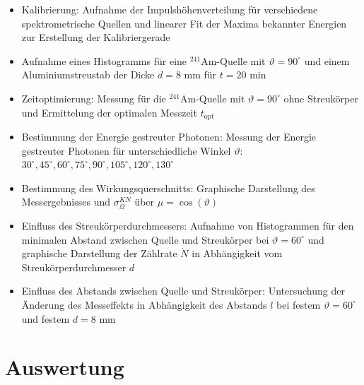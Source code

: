 \documentclass[german,  %
parskip=full,  %
]{scrartcl}
\begin{document}
\begin{itemize}
\item Kalibrierung: Aufnahme der Impulshöhenverteilung für verschiedene spektrometrische Quellen und linearer Fit der Maxima bekannter Energien zur Erstellung der Kalibriergerade
\item Aufnahme eines Histogramms für eine $^{241}$Am-Quelle mit $\vartheta = 90^{\circ}$ und einem Aluminiumstreustab der Dicke $d=8$ mm für $t = 20$ min
\item Zeitoptimierung: Messung für die $^{241}$Am-Quelle mit $\vartheta = 90^{\circ}$ ohne Streukörper und Ermittelung der optimalen Messzeit $t_{\text{opt}}$
\item Bestimmung der Energie gestreuter Photonen: Messung der Energie gestreuter Photonen für unterschiedliche Winkel $\vartheta$: $30^{\circ}, 45^{\circ}, 60^{\circ}, 75^{\circ}, 90^{\circ}, 105^{\circ}, 120^{\circ}, 130^{\circ}$
\item Bestimmung des Wirkungsquerschnitts: Graphische Darstellung des Messergebnisses und $\sigma_{\Omega}^{KN}$ über $\mu = \cos(\vartheta)$
\item Einfluss des Streukörperdurchmessers: Aufnahme von Histogrammen für den minimalen Abstand zwischen Quelle und Streukörper bei $\vartheta= 60^{\circ}$ und graphische Darstellung der Zählrate $\dot{N}$ in Abhängigkeit vom Streukörperdurchmesser $d$
\item Einfluss des Abstands zwischen Quelle und Streukörper: Untersuchung der Änderung des Messeffekts in Abhängigkeit des Abstands $l$ bei festem $\vartheta = 60^{\circ}$ und festem $d= 8 $ mm
\end{itemize}

\section{Auswertung}
\end{document}
